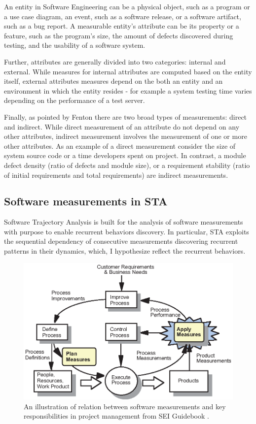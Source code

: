 An entity in Software Engineering can be a physical object, such as a program or a use case diagram, 
an event, such as a software release, or a software artifact, such as a bug report.
A measurable entity's attribute can be its property or a feature, such as the program's size, the 
amount of defects discovered during testing, and the usability of a software system.

Further, attributes are generally divided into two categories: internal and external. 
While measures for internal attributes are computed based on the entity itself, external attributes 
measures depend on the both an entity and an environment in which the entity resides - for example a 
system testing time varies depending on the performance of a test server.

Finally, as pointed by Fenton \cite{citeulike:1803429} there are two broad types of measurements: direct
and indirect. While direct measurement of an attribute do not depend on any other attributes, 
indirect measurement involves the measurement of one or more other attributes. 
As an example of a direct measurement consider the size of system source code or a time developers spent on 
project. In contrast, a module defect density (ratio of defects and module size), 
or a requirement stability (ratio of initial requirements and total requirements) are indirect measurements.

\subsection{Software measurements in STA}
Software Trajectory Analysis is built for the analysis of software measurements with purpose to enable 
recurrent behaviors discovery. In particular, STA exploits the sequential dependency of consecutive 
measurements discovering recurrent patterns in their dynamics, which, I hypothesize reflect the recurrent behaviors.

\begin{figure}[t]
   \centering
   \includegraphics[width=115mm]{figures/SEI-measurements.eps}
   \caption{An illustration of relation between software measurements and key responsibilities 
   in project management from SEI Guidebook \cite{citeulike:10567306}.}
   \label{fig:sei-measures}
\end{figure}

